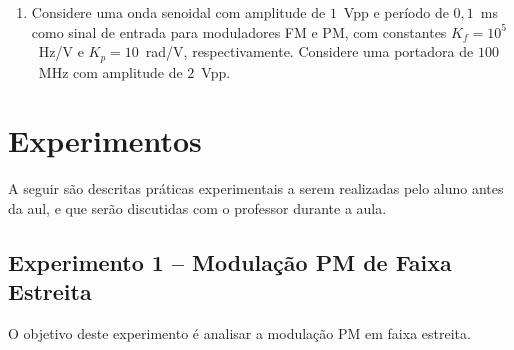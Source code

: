 \documentclass[12pt,addpoints]{exam}
\begin{document}
\begin{enumerate}
    \item Considere uma onda senoidal com amplitude de $1$~Vpp e período de $0,1$~ms como sinal de entrada para moduladores FM e PM, com constantes $K_f = 10^5$~Hz/V e $K_{p} = 10$~rad/V, respectivamente. Considere uma portadora de $100$~MHz com amplitude de $2$~Vpp.
\end{enumerate}

\section{Experimentos}

A seguir são descritas práticas experimentais a serem realizadas pelo aluno antes da aul, e que serão discutidas com o professor durante a aula. %

\subsection{Experimento 1 -- Modulação PM de Faixa Estreita}

O objetivo deste experimento é analisar a modulação PM em faixa estreita.
\end{document}
